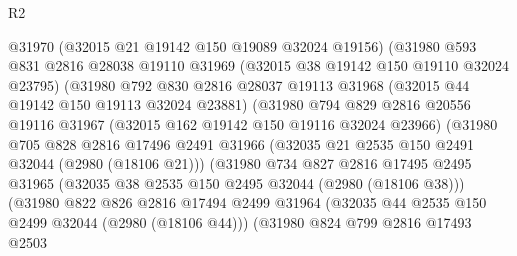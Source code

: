 \begin{lexlean}{R2}
\begin{coremodule}
                            @31970
                            (@32015 @21 @19142 @150 @19089 @32024 @19156)
                            (@31980
                              @593
                              @831
                              @2816
                              @28038
                              @19110
                              @31969
                              (@32015 @38 @19142 @150 @19110 @32024 @23795)
                              (@31980
                                @792
                                @830
                                @2816
                                @28037
                                @19113
                                @31968
                                (@32015 @44 @19142 @150 @19113 @32024 @23881)
                                (@31980
                                  @794
                                  @829
                                  @2816
                                  @20556
                                  @19116
                                  @31967
                                  (@32015 @162 @19142 @150 @19116 @32024 @23966)
                                  (@31980
                                    @705
                                    @828
                                    @2816
                                    @17496
                                    @2491
                                    @31966
                                    (@32035 @21 @2535 @150 @2491 @32044 (@2980 (@18106 @21)))
                                    (@31980
                                      @734
                                      @827
                                      @2816
                                      @17495
                                      @2495
                                      @31965
                                      (@32035 @38 @2535 @150 @2495 @32044 (@2980 (@18106 @38)))
                                      (@31980
                                        @822
                                        @826
                                        @2816
                                        @17494
                                        @2499
                                        @31964
                                        (@32035 @44 @2535 @150 @2499 @32044 (@2980 (@18106 @44)))
                                        (@31980
                                          @824
                                          @799
                                          @2816
                                          @17493
                                          @2503

\end{coremodule}
\end{lexlean}
